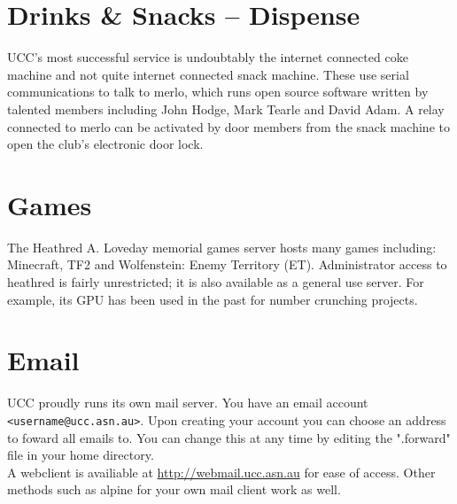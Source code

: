 \begin{comment}
This Chapter provides an overview of UCC's services (as of February 2017); how to use them, what they are for, what servers are responsible for them. The full hostname for a server is \server{server.ucc.asn.au}.
Servers are usually named after fish beginning with M. This is because they are in the Machine Room, and they run Linux. The mascot for Linux is Tux, a penguin, and he likes to eat fish.
Remember that all services are maintained by UCC's members. If you are interested in learning more, or running a new service, ask someone!
\end{comment}
\newline
\newenvironment{uccservice}[1]
{
	\section{#1}
}
\newline
\begin{uccservice}{Drinks \& Snacks -- Dispense}
	UCC's most successful service is undoubtably the internet connected coke machine and not quite internet connected snack machine. These use serial communications to talk to merlo, which runs open source software written by talented members including John Hodge, Mark Tearle and David Adam. 
	A relay connected to merlo can be activated by door members from the snack machine to open the club's electronic door lock.
\end{uccservice}
\begin{uccservice}{Games}
	The Heathred A. Loveday memorial games server hosts many games including: Minecraft, TF2 and Wolfenstein: Enemy Territory (ET).
Administrator access to heathred is fairly unrestricted; it is also available as a general use server. For example, its GPU has been used in the past for number crunching projects.
\end{uccservice}
\begin{uccservice}{Email}
	UCC proudly runs its own mail server. You have an email account \texttt{<username@ucc.asn.au>}. Upon creating your account you can choose an address to foward all emails to. You can change this at any time by editing the ".forward" file in your home directory.\\
	A webclient is availiable at \url{http://webmail.ucc.asn.au} for ease of access. Other methods such as alpine for your own mail client work as well.
\end{uccservice}

